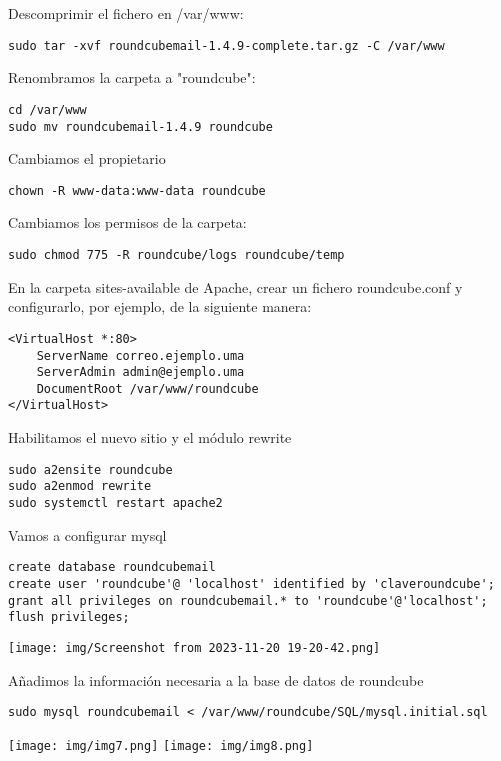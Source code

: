 \documentclass{article}
\begin{document}
Descomprimir el fichero en /var/www:
\lstset{language=Bash, breaklines=true, basicstyle=\footnotesize}
\begin{lstlisting}[frame=single]
sudo tar -xvf roundcubemail-1.4.9-complete.tar.gz -C /var/www
\end{lstlisting}

Renombramos la carpeta a "roundcube":
\lstset{language=Bash, breaklines=true, basicstyle=\footnotesize}
\begin{lstlisting}[frame=single]
cd /var/www
sudo mv roundcubemail-1.4.9 roundcube
\end{lstlisting}

Cambiamos el propietario
\lstset{language=Bash, breaklines=true, basicstyle=\footnotesize}
\begin{lstlisting}[frame=single]
chown -R www-data:www-data roundcube
\end{lstlisting}

Cambiamos los permisos de la carpeta:
\lstset{language=Bash, breaklines=true, basicstyle=\footnotesize}
\begin{lstlisting}[frame=single]
sudo chmod 775 -R roundcube/logs roundcube/temp
\end{lstlisting}
En la carpeta sites-available de Apache, crear un fichero roundcube.conf y configurarlo, por ejemplo, de la siguiente manera:
\lstset{language=Bash, breaklines=true, basicstyle=\footnotesize}
\begin{lstlisting}[frame=single]
<VirtualHost *:80>
	ServerName correo.ejemplo.uma
	ServerAdmin admin@ejemplo.uma
	DocumentRoot /var/www/roundcube
</VirtualHost> 
\end{lstlisting}

Habilitamos el nuevo sitio y el módulo rewrite
\lstset{language=Bash, breaklines=true, basicstyle=\footnotesize}
\begin{lstlisting}[frame=single]
sudo a2ensite roundcube
sudo a2enmod rewrite
sudo systemctl restart apache2
\end{lstlisting}
Vamos a configurar mysql
\lstset{language=Bash, breaklines=true, basicstyle=\footnotesize}
\begin{lstlisting}[frame=single]
create database roundcubemail
create user 'roundcube'@ 'localhost' identified by 'claveroundcube';
grant all privileges on roundcubemail.* to 'roundcube'@'localhost';
flush privileges;
\end{lstlisting}

\begin{center}
\texttt{[image: img/Screenshot from 2023-11-20 19-20-42.png]} 
\end{center}

Añadimos la información necesaria a la base de datos de roundcube
\lstset{language=Bash, breaklines=true, basicstyle=\footnotesize}
\begin{lstlisting}[frame=single]
sudo mysql roundcubemail < /var/www/roundcube/SQL/mysql.initial.sql
\end{lstlisting}

\begin{center}
\texttt{[image: img/img7.png]} 
\texttt{[image: img/img8.png]} 
\end{center}
\end{document}
